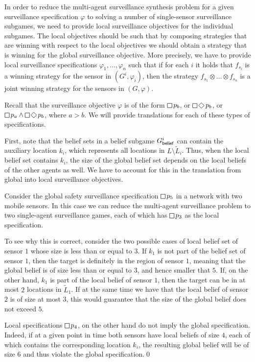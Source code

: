 In order to reduce the multi-agent surveillance synthesis problem for a given surveillance specification $\varphi$ to solving a number of single-sensor surveillance subgames, we need to provide local surveillance objectives for the individual subgames. The local objectives should be such that by composing strategies that are winning with respect to the local objectives we should obtain a strategy that is winning for the global surveillance objective. More precisely, we have to provide local surveillance specifications $\varphi_1,\ldots,\varphi_n$ such that if for each $i$ it holds that $f_{s_i}$ is  a winning strategy for the sensor in $(G^i,\varphi_i)$, then the strategy $f_{s_1}\otimes \ldots \otimes f_{s_n}$ is  a joint winning strategy for the sensors in $(G,\varphi)$.

Recall that the surveillance objective $\varphi$ is of the form $\LTLglobally p_b$, or $\LTLglobally\LTLfinally p_b$, or $\LTLglobally p_a \wedge \LTLglobally\LTLfinally p_b$, where $a > b$. We will provide translations for each of these types of  specifications.

First, note that the belief sets in a belief subgame $G^i_{\mathsf{belief}}$ can contain the auxiliary location $k_i$, which represents all locations in $L \setminus \widetilde L_i$. Thus, when the local belief set contains $k_i$, the size of the global belief set depends on the local beliefs of the other agents as well. We have to account for this in the translation from global into local surveillance objectives.

\begin{example}\label{ex:global-local-safety}
Consider the global safety surveillance specification $\LTLglobally p_5$ in a network with two mobile sensors. In this case we can reduce the multi-agent surveillance problem to two single-agent surveillance games, each of which has $\LTLglobally p_3$ as the local specification. 

To see why this is correct, consider the two possible cases of local belief set of sensor $1$ whose size is less than or equal to $3$. If $k_1$ is not part of the belief set of sensor $1$, then the target is definitely in the region of sensor $1$, meaning that the global belief is of size less than or equal to $3$, and hence smaller that $5$. If, on the other hand, $k_1$ is part of the local belief of sensor $1$, then the target can be in at most $2$ locations in $\widetilde L_1$. If at the same time we have that the local belief of sensor $2$ is of size at most $3$, this would guarantee that the size of the global belief does not exceed $5$. 

Local specifications $\LTLglobally p_4$, on the other hand do not imply the global specification. Indeed, if at a given point in time both sensors have local beliefs of size $4$, each of which contains the corresponding location $k_i$, the resulting global belief will be of size $6$ and thus violate the global specification.\qed
\end{example}

